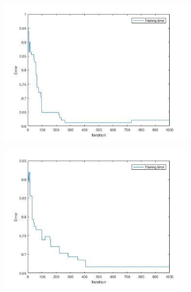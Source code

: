 \documentclass[12pt]{article}
\begin{document}
\begin{center}
  \begin{table}[H]
    \begin{varwidth}[b]{0.4\linewidth}
      \centering
      \label{table:YNNNN}
    \end{varwidth}%
    \hfill
    \begin{minipage}[b]{0.6\linewidth}
      \centering
      \includegraphics[width=100mm]{YNNNN_training_error.png}
      \label{fig:YNNNN}
    \end{minipage}
  \end{table}
\end{center}


\begin{center}
  \begin{table}[H]
    \begin{varwidth}[b]{0.4\linewidth}
      \centering
      \label{table:NYNNN}
    \end{varwidth}%
    \hfill
    \begin{minipage}[b]{0.6\linewidth}
      \centering
      \includegraphics[width=100mm]{NYNNN_training_error.png}
      \label{fig:NYNNN}
    \end{minipage}
  \end{table}
\end{center}
\end{document}
